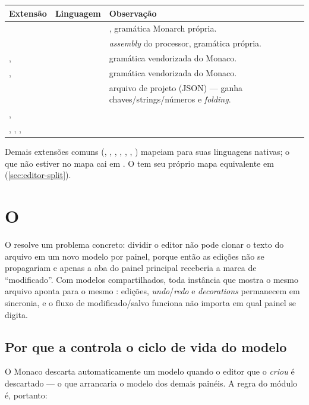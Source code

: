 \begin{tabularx}{\linewidth}{Y Y Y}
\toprule
\textbf{Extensão} & \textbf{Linguagem} & \textbf{Observação} \\
\midrule
{} &  & \cmm{}, gramática Monarch própria. \\
 &  & \emph{assembly} do processor, gramática própria. \\
,  &  & gramática vendorizada do Monaco. \\
,  &  & gramática vendorizada do Monaco. \\
 &  & arquivo de projeto (JSON) --- ganha chaves/strings/números e \emph{folding}. \\
,  &  & \\
, , ,  &  & \\
\bottomrule
\end{tabularx}

\noindent
Demais extensões comuns (, , , ,
, , ) mapeiam para suas linguagens nativas; o que não
estiver no mapa cai em . O  tem seu
próprio mapa equivalente em  (\autoref{sec:editor-split}).

\section{O }
\label{sec:editor-shared}

O  resolve um problema concreto: dividir o
editor não pode clonar o texto do arquivo em um novo modelo por painel, porque
então as edições não se propagariam e apenas a aba do painel principal receberia
a marca de \enquote{modificado}. Com modelos compartilhados, toda instância que
mostra o mesmo arquivo aponta para o mesmo : edições,
\emph{undo}/\emph{redo} e \emph{decorations} permanecem em sincronia, e o fluxo
de modificado/salvo funciona não importa em qual painel se digita.

\subsection{Por que a  controla o ciclo de vida do modelo}

O Monaco descarta automaticamente um modelo quando o editor que o \emph{criou} é
descartado --- o que arrancaria o modelo dos demais painéis. A regra do módulo é,
portanto:

